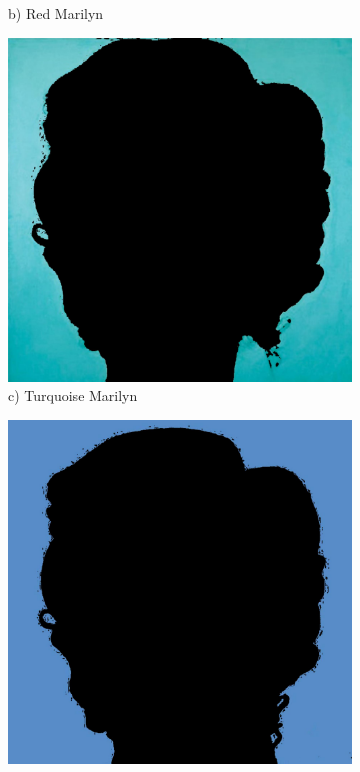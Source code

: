 \documentclass{article}
\begin{document}
\begin{figure}[htbp]
\begin{subfigure}[b]{0.19\textwidth}
        \caption*{b) Red Marilyn}
    \end{subfigure}
    \hfill
    \begin{subfigure}[b]{0.19\textwidth}
        \includegraphics[width=\textwidth]{main_files/figure-latex/10_1_turq_marilyn_background_extraction.jpg}
        \caption*{c) Turquoise Marilyn}
    \end{subfigure}
    \hfill
    \begin{subfigure}[b]{0.19\textwidth}
        \includegraphics[width=\textwidth]{main_files/figure-latex/11_1_blue_marilyn_background_extraction.jpg}

\end{subfigure}
\end{figure}
\end{document}
